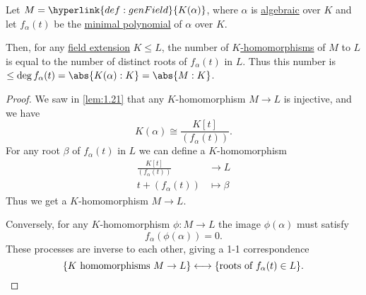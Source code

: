\documentclass{article}
\begin{document}
\begin{nlemma}\label{lem:2.6}
    Let $M = \hyperlink{def:genField}{K(\alpha)}$, where $\alpha$ is \hyperlink{def:algebraic}{algebraic} over $K$ and let $f_\alpha(t)$ be the \hyperlink{def:minimalPoly}{minimal polynomial} of $\alpha$ over $K$.

    Then, for any \hyperlink{def:fieldExt}{field extension} $K \leq L$, the number of \hyperlink{def:homo}{$K$-homomorphisms} of $M$ to $L$ is equal to the number of distinct roots of $f_\alpha(t)$ in $L$.
    Thus this number is $\leq \deg f_\alpha(t) = \abs{K(\alpha):K} = \abs{M:K}$.

    \begin{center}
    \end{center}
\end{nlemma}

\begin{proof}
    We saw in \cref{lem:1.21} that any $K$-homomorphism $M \to L$ is injective, and we have
    \begin{equation*}
        K(\alpha) \cong \frac{K[t]}{(f_\alpha(t))}.
    \end{equation*}
    For any root $\beta$ of $f_\alpha(t)$ in $L$ we can define a $K$-homomorphism
    \begin{align*}
        \frac{K[t]}{(f_\alpha(t))} &\to L \\
        t + (f_\alpha(t)) &\mapsto \beta
    \end{align*}
    Thus we get a $K$-homomorphism $M \to L$.

    Conversely, for any $K$-homomorphism $\phi:M \to L$ the image $\phi(\alpha)$ must satisfy
    \begin{equation*}f_\alpha(\phi(\alpha)) = 0.\end{equation*}
    These processes are inverse to each other, giving a 1-1 correspondence
    \begin{equation*}
        \{K \text{ homomorphisms } M \to L\} \longleftrightarrow \{\text{roots of } f_\alpha(t) \in L\}. \qedhere
    \end{equation*}
\end{proof}
\end{document}
